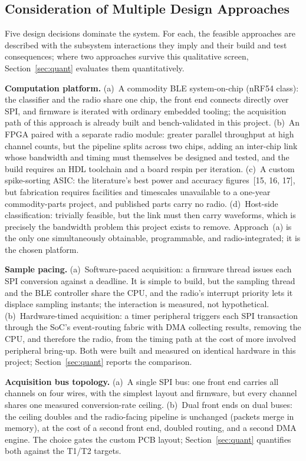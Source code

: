 \documentclass[11pt]{article}
\begin{document}
\subsection{Consideration of Multiple Design Approaches}\label{sec:approaches}
Five design decisions dominate the system. For each, the feasible approaches are
described with the subsystem interactions they imply and their build and test
consequences; where two approaches survive this qualitative screen, Section~\ref{sec:quant} evaluates
them quantitatively.

\textbf{Computation platform.} (a)~A commodity BLE system-on-chip (nRF54 class): the
classifier and the radio share one chip, the front end connects directly over SPI, and
firmware is iterated with ordinary embedded tooling; the acquisition path of this
approach is already built and bench-validated in this project. (b)~An FPGA paired with a
separate radio module: greater parallel throughput at high channel counts, but the
pipeline splits across two chips, adding an inter-chip link whose bandwidth and timing
must themselves be designed and tested, and the build requires an HDL toolchain and a
board respin per iteration. (c)~A custom spike-sorting ASIC: the literature's best power
and accuracy figures~[15, 16, 17], but fabrication requires facilities and timescales
unavailable to a one-year commodity-parts project, and published parts carry no radio.
(d)~Host-side classification: trivially feasible, but the link must then carry
waveforms, which is precisely the bandwidth problem this project exists to remove.
Approach~(a) is the only one simultaneously obtainable, programmable, and
radio-integrated; it is the chosen platform.

\textbf{Sample pacing.} (a)~Software-paced acquisition: a firmware thread issues each
SPI conversion against a deadline. It is simple to build, but the sampling thread and
the BLE controller share the CPU, and the radio's interrupt priority lets it displace
sampling instants; the interaction is measured, not hypothetical. (b)~Hardware-timed
acquisition: a timer peripheral triggers each SPI transaction through the SoC's
event-routing fabric with DMA collecting results, removing the CPU, and therefore the
radio, from the timing path at the cost of more involved peripheral bring-up. Both were
built and measured on identical hardware in this project; Section~\ref{sec:quant} reports the
comparison.

\textbf{Acquisition bus topology.} (a)~A single SPI bus: one front end carries all
channels on four wires, with the simplest layout and firmware, but every channel shares
one measured conversion-rate ceiling. (b)~Dual front ends on dual buses: the ceiling
doubles and the radio-facing pipeline is unchanged (packets merge in memory), at the
cost of a second front end, doubled routing, and a second DMA engine. The choice gates
the custom PCB layout; Section~\ref{sec:quant} quantifies both against the T1/T2 targets.
\end{document}
